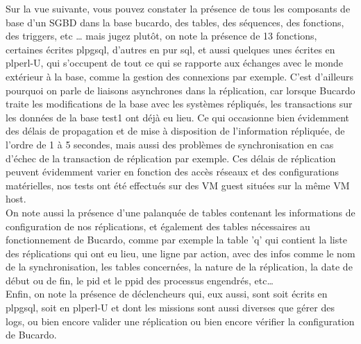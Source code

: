 \documentclass[12pt]{report}
\begin{document}
Sur la vue suivante, vous pouvez constater la présence de tous les composants de
base d'un SGBD dans la base bucardo, des tables, des séquences, des fonctions,
des triggers, etc … mais jugez plutôt, on note la présence de 13 fonctions,
certaines écrites plpgsql, d'autres en pur sql, et aussi quelques unes écrites
en plperl-U, qui s'occupent de tout ce qui se rapporte aux échanges avec le
monde extérieur à la base, comme la gestion des connexions par exemple. C'est
d'ailleurs pourquoi on parle de liaisons asynchrones dans la réplication, car
lorsque Bucardo traite les modifications de la base avec les systèmes
répliqués, les transactions sur les données de la base test1 ont déjà eu
lieu. Ce qui occasionne bien évidemment des délais de propagation et de mise à
disposition de l'information répliquée, de l'ordre de 1 à 5 secondes, mais aussi
des problèmes de synchronisation en cas d'échec de la transaction de réplication
par exemple. Ces délais de réplication peuvent évidemment varier en fonction des
accès réseaux et des configurations matérielles, nos tests ont été effectués sur
des VM guest situées sur la même VM host. \\

On note aussi la présence d'une palanquée de tables contenant les informations
de configuration de nos réplications, et également des tables nécessaires au
fonctionnement de Bucardo, comme par exemple la table 'q' qui contient la liste
des réplications qui ont eu lieu, une ligne par action, avec des infos comme le
nom de la synchronisation, les tables concernées, la nature de la réplication,
la date de début ou de fin, le pid et le ppid des processus engendrés, etc… \\

Enfin, on note la présence de déclencheurs qui, eux aussi, sont soit écrits en
plpgsql, soit en plperl-U et dont les missions  sont aussi diverses que gérer
des logs, ou bien encore valider une réplication ou bien encore vérifier la
configuration de Bucardo. \\
\end{document}
